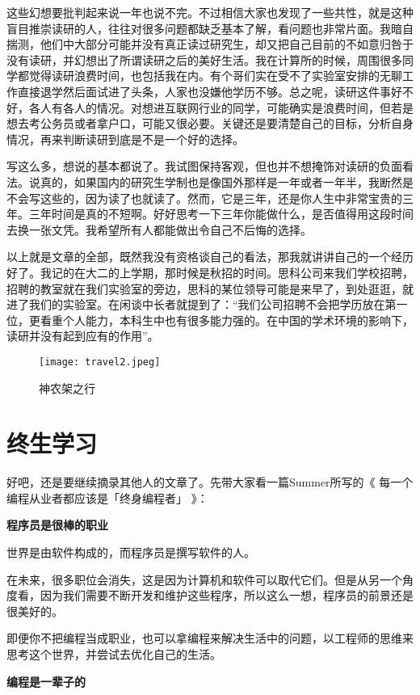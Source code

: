 \documentclass[cn,11pt]{elegantbook}
\begin{document}
这些幻想要批判起来说一年也说不完。不过相信大家也发现了一些共性，就是这种盲目推崇读研的人，往往对很多问题都缺乏基本了解，看问题也非常片面。我暗自揣测，他们中大部分可能并没有真正读过研究生，却又把自己目前的不如意归咎于没有读研，并幻想出了所谓读研之后的美好生活。我在计算所的时候，周围很多同学都觉得读研浪费时间，也包括我在内。有个哥们实在受不了实验室安排的无聊工作直接退学然后面试进了头条，人家也没嫌他学历不够。总之呢，读研这件事好不好，各人有各人的情况。对想进互联网行业的同学，可能确实是浪费时间，但若是想去考公务员或者拿户口，可能又很必要。关键还是要清楚自己的目标，分析自身情况，再来判断读研到底是不是一个好的选择。

写这么多，想说的基本都说了。我试图保持客观，但也并不想掩饰对读研的负面看法。说真的，如果国内的研究生学制也是像国外那样是一年或者一年半，我断然是不会写这些的，因为读了也就读了。然而，它是三年，还是你人生中非常宝贵的三年。三年时间是真的不短啊。好好思考一下三年你能做什么，是否值得用这段时间去换一张文凭。我希望所有人都能做出令自己不后悔的选择。

以上就是文章的全部，既然我没有资格谈自己的看法，那我就讲讲自己的一个经历好了。我记的在大二的上学期，那时候是秋招的时间。思科公司来我们学校招聘，招聘的教室就在我们实验室的旁边，思科的某位领导可能是来早了，到处逛逛，就进了我们的实验室。在闲谈中长者就提到了：“我们公司招聘不会把学历放在第一位，更看重个人能力，本科生中也有很多能力强的。在中国的学术环境的影响下，读研并没有起到应有的作用”。

\begin{figure}[htbp]
	\centering
	\texttt{[image: travel2.jpeg]}
	\caption{ 神农架之行 }
\end{figure}

\section{终生学习}
好吧，还是要继续摘录其他人的文章了。先带大家看一篇Summer所写的《 每一个编程从业者都应该是「终身编程者」 》：

\textbf{程序员是很棒的职业}

世界是由软件构成的，而程序员是撰写软件的人。

在未来，很多职位会消失，这是因为计算机和软件可以取代它们。但是从另一个角度看，因为我们需要不断开发和维护这些程序，所以这么一想，程序员的前景还是很美好的。

即便你不把编程当成职业，也可以拿编程来解决生活中的问题，以工程师的思维来思考这个世界，并尝试去优化自己的生活。

\textbf{编程是一辈子的}
\end{document}
